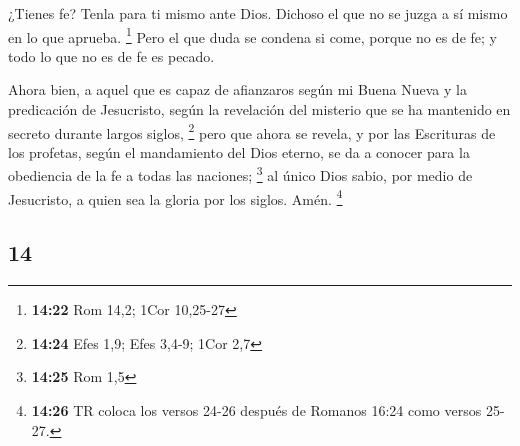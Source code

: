 \begin{paracol}{2}
 ¿Tienes fe? Tenla para ti mismo ante Dios. Dichoso el
que no se juzga a sí mismo en lo que aprueba. \footnote{\textbf{14:22}
  Rom 14,2; 1Cor 10,25-27}  Pero el que duda se condena
si come, porque no es de fe; y todo lo que no es de fe es pecado.

 Ahora bien, a aquel que es capaz de afianzaros según mi
Buena Nueva y la predicación de Jesucristo, según la revelación del
misterio que se ha mantenido en secreto durante largos siglos,
\footnote{\textbf{14:24} Efes 1,9; Efes 3,4-9; 1Cor 2,7} 
pero que ahora se revela, y por las Escrituras de los profetas, según el
mandamiento del Dios eterno, se da a conocer para la obediencia de la fe
a todas las naciones; \footnote{\textbf{14:25} Rom 1,5} 
al único Dios sabio, por medio de Jesucristo, a quien sea la gloria por
los siglos. Amén. \footnote{\textbf{14:26} TR coloca los versos 24-26
  después de Romanos 16:24 como versos 25-27.}

\switchcolumn
\begin{otherlanguage}{english}

\hypertarget{section-27}{%
\section{14}\label{section-27}}


\end{otherlanguage}
\end{paracol}
